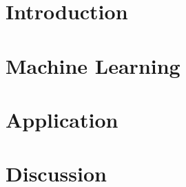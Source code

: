 \documentclass[12pt]{report}
\begin{document}
\chapter{Introduction}


\chapter{Machine Learning}


\chapter{Application}


\chapter{Discussion}





\pagestyle{plain}
\end{document}
